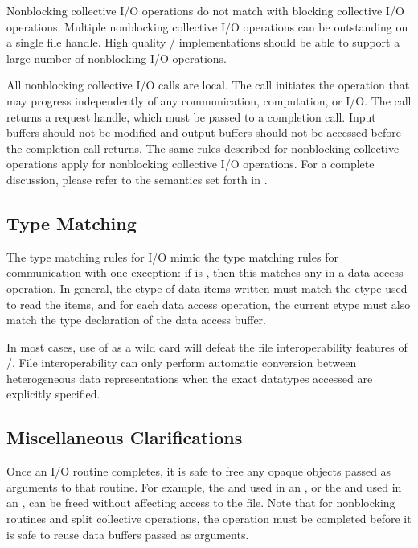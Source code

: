 Nonblocking collective I/O operations do not match with blocking collective
I/O operations. Multiple nonblocking collective I/O operations can be
outstanding on a single file handle.  High quality \MPI/ implementations should
be able to support a large number of  nonblocking I/O operations.

All nonblocking collective I/O calls are local. The call initiates the
operation that may progress independently of any communication, computation,
or I/O. The call returns a request handle, which must be passed to a
completion call. Input buffers should not be modified and output buffers
should not be accessed before the completion call returns. 
The same 
rules described for nonblocking collective operations apply for nonblocking
collective I/O operations. For a complete discussion, please refer to the
semantics set forth in .

\subsection{Type Matching}
  
The type matching rules for I/O mimic the type matching rules
for communication with one exception:
if  is , then
this matches any  in a data access operation.
In general, the etype of data items written must
match the etype used to read the items,
and for each data access operation,
the current etype must also match the type declaration
of the data access buffer.

\begin{users}
In most cases, use of  as a wild card will
defeat the file interoperability features of \MPI/.
File interoperability can only perform automatic conversion
between heterogeneous data representations when the exact datatypes
accessed are explicitly specified.
\end{users}

\subsection{Miscellaneous Clarifications}
Once an I/O routine completes, it is safe to free any opaque
objects passed as arguments to that routine.
For example,
the  and  used in an ,
or the  and 
used in an ,
can be freed without affecting access to the file.
Note that for nonblocking routines
and split collective operations,
the operation must be completed
before it is safe to reuse data buffers passed as arguments.


